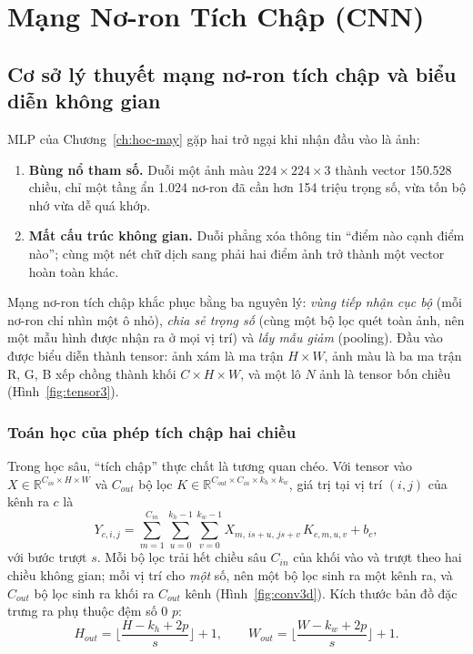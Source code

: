 \chapter{Mạng Nơ-ron Tích Chập (CNN)}
\label{ch:cnn}

\section{Cơ sở lý thuyết mạng nơ-ron tích chập và biểu diễn không gian}

MLP của Chương~\ref{ch:hoc-may} gặp hai trở ngại khi nhận đầu vào là ảnh:
\begin{enumerate}
  \item \textbf{Bùng nổ tham số.} Duỗi một ảnh màu $224{\times}224{\times}3$ thành vector 150.528 chiều, chỉ một tầng
    ẩn 1.024 nơ-ron đã cần hơn 154 triệu trọng số, vừa tốn bộ nhớ vừa dễ quá khớp.
  \item \textbf{Mất cấu trúc không gian.} Duỗi phẳng xóa thông tin “điểm nào cạnh điểm nào”; cùng một nét chữ dịch sang
    phải hai điểm ảnh trở thành một vector hoàn toàn khác.
\end{enumerate}
Mạng nơ-ron tích chập \cite{lecun1998} khắc phục bằng ba nguyên lý: \emph{vùng tiếp nhận cục bộ} (mỗi nơ-ron chỉ nhìn một
ô nhỏ), \emph{chia sẻ trọng số} (cùng một bộ lọc quét toàn ảnh, nên một mẫu hình được nhận ra ở mọi vị trí) và
\emph{lấy mẫu giảm} (pooling). Đầu vào được biểu diễn thành tensor: ảnh xám là ma trận $H{\times}W$, ảnh màu là ba ma trận
R, G, B xếp chồng thành khối $C{\times}H{\times}W$, và một lô $N$ ảnh là tensor bốn chiều (Hình~\ref{fig:tensor3}).


\subsection{Toán học của phép tích chập hai chiều}

Trong học sâu, “tích chập” thực chất là tương quan chéo. Với tensor vào $X \in \mathbb{R}^{C_{in}\times H\times W}$ và
$C_{out}$ bộ lọc $K \in \mathbb{R}^{C_{out}\times C_{in}\times k_h\times k_w}$, giá trị tại vị trí $(i, j)$ của kênh ra $c$ là
\begin{equation}
  Y_{c,i,j} = \sum_{m=1}^{C_{in}}\sum_{u=0}^{k_h-1}\sum_{v=0}^{k_w-1} X_{m,\,i s+u,\,j s+v}\,K_{c,m,u,v} + b_c ,
  \label{eq:conv}
\end{equation}
với bước trượt $s$. Mỗi bộ lọc trải hết chiều sâu $C_{in}$ của khối vào và trượt theo hai chiều không gian; mỗi vị trí cho
\emph{một} số, nên một bộ lọc sinh ra một kênh ra, và $C_{out}$ bộ lọc sinh ra khối ra $C_{out}$ kênh
(Hình~\ref{fig:conv3d}). Kích thước bản đồ đặc trưng ra phụ thuộc đệm số 0 $p$:
\begin{equation}
  H_{out} = \Big\lfloor\frac{H - k_h + 2p}{s}\Big\rfloor + 1, \qquad W_{out} = \Big\lfloor\frac{W - k_w + 2p}{s}\Big\rfloor + 1 .
  \label{eq:outsize}
\end{equation}

